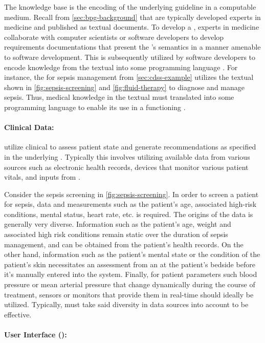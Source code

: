 The knowledge base is the encoding of the underlying guideline in a
computable medium. Recall from \autoref{sec:bpg-background}
that \BPGs{} are typically developed experts in medicine and published
as textual documents. To develop a \CDSS{}, experts in medicine
collaborate with computer scientists or software developers to
develop requirements documentations that present the \BPG{}'s
semantics in a manner amenable to software development.
This is subsequently utilized by software developers to encode
knowledge from the textual \BPG{} into some programming language \cite{PelegJBI13}.
For instance, the \CDSS{} for sepsis management from \autoref{sec:cdss-example}
utilizes the textual \BPG{} shown in \autoref{fig:sepsis-screening}
and \autoref{fig:fluid-therapy} to diagnose and manage sepsis.
Thus, medical knowledge in the textual \BPG{} must translated into some
programming language to enable its use in a functioning \CDSS{}.

\paragraph{Clinical Data:}

\CDSSs{} utilize clinical to assess patient state and
generate recommendations as specified in the underlying \BPG{}. Typically this involves
utilizing available data from various sources such as electronic health records,
devices that monitor various patient vitals, and inputs from \HCPs{}.

Consider the sepsis screening \BPG{} in \autoref{fig:sepsis-screening}.
In order to screen a patient for sepsis, data and
measurements such as the patient's age, associated high-risk conditions,
mental status, heart rate, etc. is required. The origins
of the data is generally very diverse. Information such
as the patient's age, weight and associated high risk conditions
remain static over the duration of sepsis management, and can be
obtained from the patient's health records.
On the other hand, information such as the patient's mental
state or the condition of the patient's skin necessitates an assessment from an
\HCP{} at the patient's bedside before it's manually entered into the system.
Finally, for patient parameters such blood pressure or mean arterial pressure
that change dynamically during the course of treatment, sensors or monitors
that provide them in real-time should ideally be utilized.
Typically, \CDSS{} must take said diversity in data sources into account
to be effective.

\paragraph{User Interface (\UI{}):}

